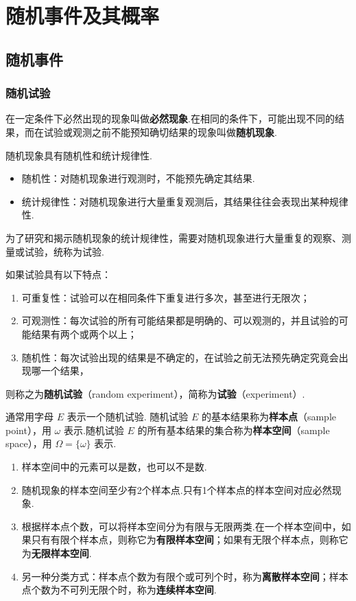 
\chapter{随机事件及其概率}

\section{随机事件}

\subsection{随机试验}

在一定条件下必然出现的现象叫做\textbf{必然现象}.在相同的条件下，可能出现不同的结果，而在试验或观测之前不能预知确切结果的现象叫做\textbf{随机现象}.

随机现象具有随机性和统计规律性.

\begin{itemize}
    \item 随机性：对随机现象进行观测时，不能预先确定其结果.
    \item 统计规律性：对随机现象进行大量重复观测后，其结果往往会表现出某种规律性.
\end{itemize}

为了研究和揭示随机现象的统计规律性，需要对随机现象进行大量重复的观察、测量或试验，统称为试验.

如果试验具有以下特点：
\begin{enumerate}
    \item 可重复性：试验可以在相同条件下重复进行多次，甚至进行无限次；
    \item 可观测性：每次试验的所有可能结果都是明确的、可以观测的，并且试验的可能结果有两个或两个以上；
    \item 随机性：每次试验出现的结果是不确定的，在试验之前无法预先确定究竟会出现哪一个结果，
\end{enumerate}
则称之为\textbf{随机试验}（random experiment），简称为\textbf{试验}（experiment）.

通常用字母 $E$ 表示一个随机试验. 随机试验 $E$ 的基本结果称为\textbf{样本点}（sample point），用 $\omega$ 表示.随机试验 $E$ 的所有基本结果的集合称为\textbf{样本空间}（sample space），用 $\varOmega = \{ \omega \}$ 表示.

\begin{note}
    \begin{enumerate}
        \item 样本空间中的元素可以是数，也可以不是数.
        \item 随机现象的样本空间至少有2个样本点.只有1个样本点的样本空间对应必然现象.
        \item 根据样本点个数，可以将样本空间分为有限与无限两类.在一个样本空间中，如果只有有限个样本点，则称它为\textbf{有限样本空间}；如果有无限个样本点，则称它为\textbf{无限样本空间}.
        \item 另一种分类方式：样本点个数为有限个或可列个时，称为\textbf{离散样本空间}；样本点个数为不可列无限个时，称为\textbf{连续样本空间}.
    \end{enumerate}
\end{note}

